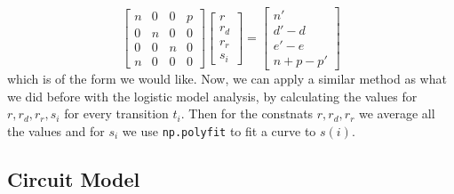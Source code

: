 \documentclass{report}
\begin{document}
                \begin{equation}
                    \begin{bmatrix}
                        n & 0 & 0 & p \\
                        0 & n & 0 & 0 \\
                        0 & 0 & n & 0 \\
                        n & 0 & 0 & 0
                    \end{bmatrix}\begin{bmatrix}
                        r \\
                        r_d \\
                        r_r \\
                        s_i
                    \end{bmatrix} = \begin{bmatrix}
                        n' \\
                        d' - d \\
                        e' - e \\
                        n + p - p'
                    \end{bmatrix}
                \end{equation}
                which is of the form we would like. Now, we can apply a similar method as what we did before with the logistic model analysis, by calculating the values for $r, r_d, r_r, s_i$ for every transition $t_i$. Then for the constnats $r, r_d, r_r$ we average all the values and for $s_i$ we use \lstinline{np.polyfit} to fit a curve to $s(i)$.
        \subsection{Circuit Model}
\end{document}
